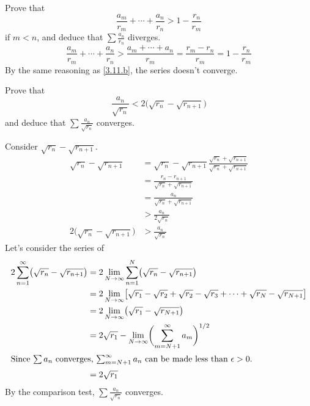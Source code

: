 \begin{exercise}
\begin{exercise}[label = (\alph*)]
    Prove that
    \[
    \frac{a_m}{r_m} + \cdots + \frac{a_n}{r_n} > 1 - \frac{r_n}{r_m}
    \]
    if \(m < n\), and deduce that \(\sum\frac{a_n}{r_n}\) diverges.
    \[
    \frac{a_m}{r_m} + \cdots + \frac{a_n}{r_n} >
    \frac{a_m + \cdots + a_n}{r_m} = \frac{r_m - r_n}{r_m} =
    1 - \frac{r_n}{r_m}
    \]
    By the same reasoning as \cref{3.11.b}, the series doesn't converge.
  \item
    Prove that
    \[
    \frac{a_n}{\sqrt{r_n}} < 2\bigl(\sqrt{r_n} - \sqrt{r_{n + 1}}\bigr)
    \]
    and deduce that \(\sum\frac{a_n}{\sqrt{r_n}}\) converges.
    \par\smallskip
    Consider \(\sqrt{r_n} - \sqrt{r_{n + 1}}\).
    \begin{align*}
      \sqrt{r_n} - \sqrt{r_{n + 1}}
      & = \sqrt{r_n} - \sqrt{r_{n + 1}}
        \frac{\sqrt{r_n} + \sqrt{r_{n + 1}}}{\sqrt{r_n} + \sqrt{r_{n + 1}}}\\
      & = \frac{r_n - r_{n + 1}}{\sqrt{r_n} + \sqrt{r_{n + 1}}}\\
      & = \frac{a_n}{\sqrt{r_n} + \sqrt{r_{n + 1}}}\\
      & > \frac{a_n}{2\sqrt{r_n}}\\
      2\bigl(\sqrt{r_n} - \sqrt{r_{n + 1}}\bigr) & > \frac{a_n}{\sqrt{r_n}}
    \end{align*}
    Let's consider the series of
    \begin{align*}
      2\sum_{n = 1}^{\infty}\bigl(\sqrt{r_n} - \sqrt{r_{n + 1}}\bigr)
      & = 2\lim_{N\to\infty}\sum_{n = 1}^N
        \bigl(\sqrt{r_n} - \sqrt{r_{n + 1}}\bigr)\\
      & = 2\lim_{N\to\infty}\bigl[\sqrt{r_1} - \sqrt{r_2} + \sqrt{r_2} -
        \sqrt{r_3} + \cdots + \sqrt{r_N} - \sqrt{r_{N + 1}}\bigr]\\
      & = 2\lim_{N\to\infty}\bigl(\sqrt{r_1} - \sqrt{r_{N + 1}}\bigr)\\
      & = 2\sqrt{r_1} - \lim_{N\to\infty}
        \biggl(\sum_{m = N + 1}^{\infty}a_m\biggr)^{1/2}\\
      \intertext{Since \(\sum a_n\) converges, \(\sum_{m = N + 1}^{\infty}a_n\)
      can be made less than \(\epsilon > 0\).}
      & = 2\sqrt{r_1}
    \end{align*}
    By the comparison test, \(\sum\frac{a_n}{\sqrt{r_n}}\) converges.
  \end{exercise}
\item

\end{exercise}
